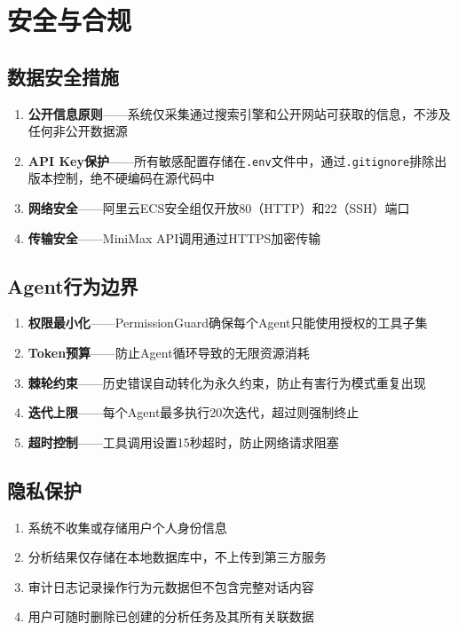 \documentclass[12pt,a4paper]{ctexrep}
\begin{document}
\chapter{安全与合规}

\section{数据安全措施}

\begin{enumerate}
\item \textbf{公开信息原则}——系统仅采集通过搜索引擎和公开网站可获取的信息，不涉及任何非公开数据源
\item \textbf{API Key保护}——所有敏感配置存储在\texttt{.env}文件中，通过\texttt{.gitignore}排除出版本控制，绝不硬编码在源代码中
\item \textbf{网络安全}——阿里云ECS安全组仅开放80（HTTP）和22（SSH）端口
\item \textbf{传输安全}——MiniMax API调用通过HTTPS加密传输
\end{enumerate}

\section{Agent行为边界}

\begin{enumerate}
\item \textbf{权限最小化}——PermissionGuard确保每个Agent只能使用授权的工具子集
\item \textbf{Token预算}——防止Agent循环导致的无限资源消耗
\item \textbf{棘轮约束}——历史错误自动转化为永久约束，防止有害行为模式重复出现
\item \textbf{迭代上限}——每个Agent最多执行20次迭代，超过则强制终止
\item \textbf{超时控制}——工具调用设置15秒超时，防止网络请求阻塞
\end{enumerate}

\section{隐私保护}

\begin{enumerate}
\item 系统不收集或存储用户个人身份信息
\item 分析结果仅存储在本地数据库中，不上传到第三方服务
\item 审计日志记录操作行为元数据但不包含完整对话内容
\item 用户可随时删除已创建的分析任务及其所有关联数据
\end{enumerate}
\end{document}

